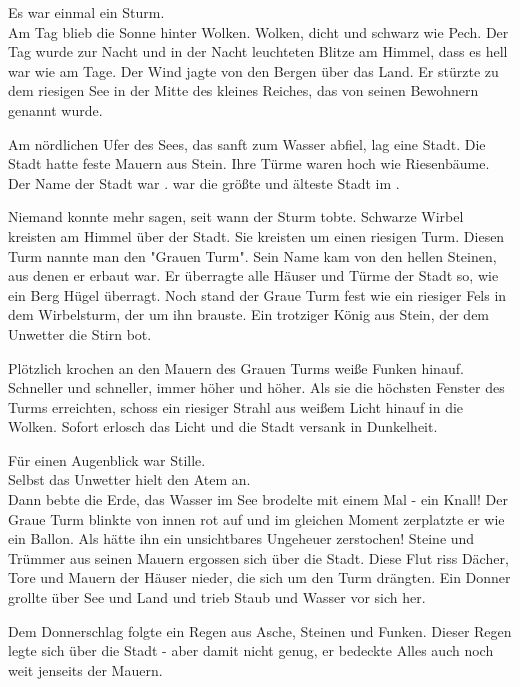 





\begin{huge}
\begin{itshape}
Es war einmal ein Sturm.\\
Am Tag blieb die Sonne hinter Wolken. Wolken, dicht und schwarz wie Pech. Der Tag wurde zur Nacht und in der Nacht leuchteten Blitze am Himmel, dass es hell war wie am Tage. Der Wind jagte von den Bergen über das Land. Er stürzte zu dem riesigen See in der Mitte des kleines Reiches, das von seinen Bewohnern {\Enland} genannt wurde. 

Am nördlichen Ufer des Sees, das sanft zum Wasser abfiel, lag eine Stadt. Die Stadt hatte feste Mauern aus Stein. Ihre Türme waren hoch wie Riesenbäume. Der Name der Stadt war {\Tern}. {\Tern} war die größte und älteste Stadt im {\Enland}. 

Niemand konnte mehr sagen, seit wann der Sturm tobte. Schwarze Wirbel kreisten am Himmel über der Stadt. Sie kreisten um einen riesigen Turm. Diesen Turm nannte man den "Grauen Turm". Sein Name kam von den hellen Steinen, aus denen er erbaut war. Er überragte alle Häuser und Türme der Stadt so, wie ein Berg Hügel überragt. Noch stand der Graue Turm fest wie ein riesiger Fels in dem Wirbelsturm, der um ihn brauste. Ein trotziger König aus Stein, der dem Unwetter die Stirn bot.

Plötzlich krochen an den Mauern des Grauen Turms weiße Funken hinauf. Schneller und schneller, immer höher und höher. Als sie die höchsten Fenster des Turms erreichten, schoss ein riesiger Strahl aus weißem Licht hinauf in die Wolken. Sofort erlosch das Licht und die Stadt versank in Dunkelheit.

Für einen Augenblick war Stille.\\
Selbst das Unwetter hielt den Atem an.\\
Dann bebte die Erde, das Wasser im See brodelte mit einem Mal - ein Knall! Der Graue Turm blinkte von innen rot auf und im gleichen Moment zerplatzte er wie ein Ballon. Als hätte ihn ein unsichtbares Ungeheuer zerstochen! Steine und Trümmer aus seinen Mauern ergossen sich über die Stadt. Diese Flut riss Dächer, Tore und Mauern der Häuser nieder, die sich um den Turm drängten. Ein Donner grollte über See und Land und trieb Staub und Wasser vor sich her.

Dem Donnerschlag folgte ein Regen aus Asche, Steinen und Funken. Dieser Regen legte sich über die Stadt - aber damit nicht genug, er bedeckte Alles auch noch weit jenseits der Mauern.


\end{itshape}
\end{huge}
